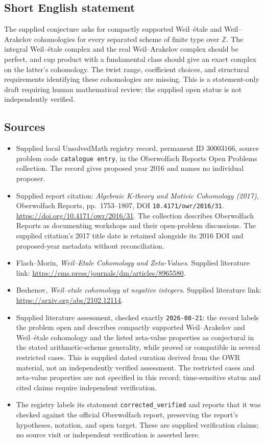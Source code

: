 \documentclass[11pt]{article}
\newcommand{\Z}{\mathbb{Z}}
\begin{document}
\subsection{Short English statement}
The supplied conjecture asks for compactly supported Weil--\'{e}tale and Weil--Arakelov cohomologies for every separated scheme of finite type over \(\Z\). The integral Weil--\'{e}tale complex and the real Weil--Arakelov complex should be perfect, and cup product with a fundamental class should give an exact complex on the latter's cohomology. The twist range, coefficient choices, and structural requirements identifying these cohomologies are missing. This is a statement-only draft requiring human mathematical review; the supplied open status is not independently verified.
\subsection{Sources}
\begin{itemize}
\item Supplied local UnsolvedMath registry record, permanent ID \(30003166\), source problem code \texttt{catalogue entry}, in the Oberwolfach Reports Open Problems collection. The record gives proposed year 2016 and names no individual proposer.
\item Supplied report citation: \emph{Algebraic K-theory and Motivic Cohomology (2017)}, Oberwolfach Reports, pp.\ 1753--1807, DOI \texttt{10.4171/owr/2016/31}. \url{https://doi.org/10.4171/owr/2016/31}. The collection describes Oberwolfach Reports as documenting workshops and their open-problem discussions. The supplied citation's 2017 title date is retained alongside its 2016 DOI and proposed-year metadata without reconciliation.
\item Flach--Morin, \emph{Weil--Etale Cohomology and Zeta-Values}. Supplied literature link: \url{https://ems.press/journals/dm/articles/8965580}.
\item Beshenov, \emph{Weil--etale cohomology at negative integers}. Supplied literature link: \url{https://arxiv.org/abs/2102.12114}.
\item Supplied literature assessment, checked exactly \texttt{2026-08-21}: the record labels the problem open and describes compactly supported Weil--Arakelov and Weil--\'{e}tale cohomology and the listed zeta-value properties as conjectural in the stated arithmetic-scheme generality, while proved or compatible in several restricted cases. This is supplied dated curation derived from the OWR material, not an independently verified assessment. The restricted cases and zeta-value properties are not specified in this record; time-sensitive status and cited claims require independent verification.
\item The registry labels its statement \texttt{corrected\_verified} and reports that it was checked against the official Oberwolfach report, preserving the report's hypotheses, notation, and open target. These are supplied verification claims; no source visit or independent verification is asserted here.
\end{itemize}
\end{document}
